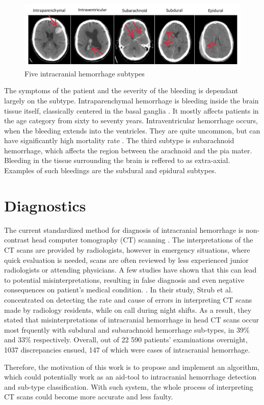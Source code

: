 \begin{figure}[h]
\begin{centering}
\includegraphics[width=14cm]{assets/images/subtypes}
\par\end{centering}
\caption{Five intracranial hemorrhage subtypes \label{fig:subtypes}}
\end{figure}

The symptoms of the patient and the severity of the bleeding is dependant largely on the subtype. Intraparenchymal hemorrhage is bleeding inside the brain tissue itself, classically centered in the basal ganglia \cite{imagingICH}. It mostly affects patients in the age category from sixty to seventy years. Intraventricular hemorrhage occurs, when the bleeding extends into the ventricles. They are quite uncommon, but can have significantly high mortality rate \cite{neuroimagingInTraumaticImageing}. The third subtype is subarachnoid hemorrhage, which affects the region between the arachnoid and the pia mater. Bleeding in the tissue surrounding the brain is reffered to as extra-axial. Examples of such bleedings are the subdural and epidural subtypes.

\section{Diagnostics}
The current standardized method for diagnosis of intracranial hemorrhage is non-contrast head computer tomography (CT) scanning \cite{imagingICH}. The interpretations of the CT scans are provided by radiologists, however in emergency situations, where quick evaluation is needed, scans are often reviewed by less experienced junior radiologists or attending physicians. A few studies have shown that this can lead to potential misinterpretations, resulting in false diagnosis and even negative consequences on patient's medical condition.  \cite{residentEval, overnightCTinterpret}. In their study, Strub et al. \cite{overnightCTinterpret} concentrated on detecting the rate and cause of errors in interpreting CT scans made by radiology residents, while on call during night shifts. As a result, they stated that misinterpretations of intracranial hemorrhage in head CT scans occur most frquently with subdural and subarachnoid hemorrhage sub-types, in 39\% and 33\% respectively. Overall, out of 22 590 patients' examinations overnight, 1037 discrepancies ensued, 147 of which were cases of intracranial hemorrhage.

Therefore, the motivation of this work is to propose and implement an algorithm, which could potentially work as an aid-tool to intracranial hemorrhage detection and sub-type classification. With such system, the whole process of interpreting CT scans could become more accurate and less faulty.
